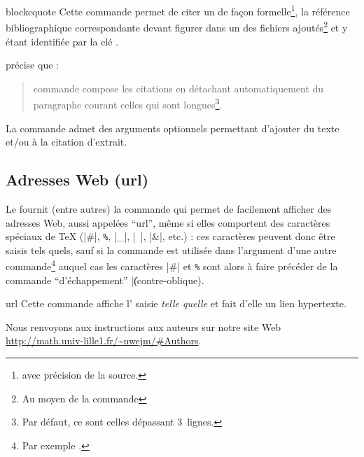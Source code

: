 \documentclass[french,nolocaltoc]{nwejmart}
\newtheorem[title=Fait,style=definition]{fact}
\begin{document}
\begin{docCommand}{blockcquote}{}
  Cette commande permet de citer un  de façon
  formelle\footnote{\Ie*{} avec précision de la source.}, la référence
  bibliographique correspondante devant figurer dans un des fichiers 
  ajoutés\footnote{Au moyen de la commande } et
  y étant identifiée par la clé .

\begin{bodycode}
\citeauthor{Bitouze} précise que :
\blockcquote{Bitouze}{%
   commande compose les citations en détachant
  automatiquement du paragraphe courant celles qui sont
  longues\footnote{Par défaut, ce sont celles
    dépassant 3~lignes.}.%
}.
\end{bodycode}
\end{docCommand}

La commande  admet des arguments optionnels permettant
d'ajouter du texte  et/ou  à la citation
d'extrait\autocite[Pour plus de détails, cf. par exemple][]{Bitouze}.


\subsection{Adresses Web (\texorpdfstring{\acrshort{url}}{URL})}
\label{sec-url}

Le  fournit (entre autres) la commande  qui
permet de facilement afficher des adresses Web, aussi appelées
\enquote{\gls{url}}, même si elles comportent des caractères spéciaux de \TeX{}
(|#|,
%
\lstinline[commentstyle={}]+%+,
%
|_|, |~|, |&|, etc.) : ces caractères peuvent donc être saisis tels quels, sauf
si la commande  est utilisée dans l'argument d'une autre
commande\footnote{Par exemple \protect{}.} auquel cas les
caractères |#| et
%
\lstinline[commentstyle={}]+%+
%
sont alors à faire précéder de la commande \enquote{d'échappement} |\|
(contre-oblique).%

\begin{docCommand}{url}{}
  Cette commande affiche l' saisie \emph{telle quelle} et fait
  d'elle un lien hypertexte.
\begin{bodycode}[listing and text,listing options={deletekeywords={url,math,nwejm,exemple,pdf}}]
Nous renvoyons aux instructions aux auteurs sur notre site Web
\url{http://math.univ-lille1.fr/~nwejm/#Authors}.
\end{bodycode}
\end{docCommand}
\end{document}
